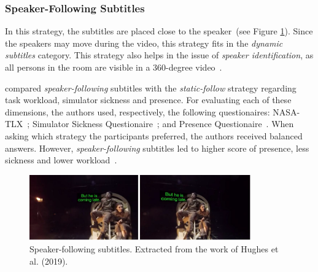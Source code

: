 \subsubsection{Speaker-Following Subtitles}
\label{subsubsec:speaker_following}

In this strategy, the subtitles are placed close to the speaker~(see Figure \ref{fig:speaker_following}). Since the speakers may move during the video, this strategy fits in the \emph{dynamic subtitles} category. This strategy also helps in the issue of \emph{speaker identification}, as all persons in the room are visible in a 360-degree video~\cite{rothe_dynamic_2018}.  

 compared \emph{speaker-following} subtitles with the \emph{static-follow} strategy regarding task workload, simulator sickness and presence. For evaluating each of these dimensions, the authors used, respectively, the following questionaires: NASA-TLX~\cite{nasa_hart1988development}; Simulator Sickness Questionaire~\cite{sickness_kennedy1993simulator}; and Presence Questionaire~\cite{presence_witmer1998measuring}. When asking which strategy the participants preferred, the authors received balanced answers. However, \emph{speaker-following} subtitles led to higher score of presence, less sickness and lower workload~\cite{rothe_dynamic_2018}.

\begin{figure}[!ht]
    \centering
    \includegraphics[width=0.85\textwidth]{img/speaker-following.png}
    \caption{Speaker-following subtitles. Extracted from the work of Hughes et al. (2019).}
    \label{fig:speaker_following}
\end{figure}
